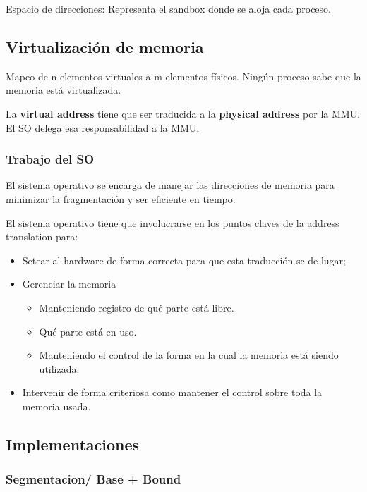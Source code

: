 \documentclass{article}
\begin{document}
Espacio de direcciones: Representa el sandbox donde se aloja cada
proceso.

\subsection{Virtualización de
memoria}\label{virtualizaciuxf3n-de-memoria}

Mapeo de n elementos virtuales a m elementos físicos. Ningún proceso
sabe que la memoria está virtualizada.

La \textbf{virtual address} tiene que ser traducida a la
\textbf{physical address} por la MMU. El SO delega esa responsabilidad a
la MMU.

\subsubsection{Trabajo del SO}\label{trabajo-del-so}

El sistema operativo se encarga de manejar las direcciones de memoria
para minimizar la fragmentación y ser eficiente en tiempo.

El sistema operativo tiene que involucrarse en los puntos claves de la
address translation para:

\begin{itemize}
\item
  Setear al hardware de forma correcta para que esta traducción se de
  lugar;
\item
  Gerenciar la memoria

  \begin{itemize}
  \item
    Manteniendo registro de qué parte está libre.
  \item
    Qué parte está en uso.
  \item
    Manteniendo el control de la forma en la cual la memoria está siendo
    utilizada.
  \end{itemize}
\item
  Intervenir de forma criteriosa como mantener el control sobre toda la
  memoria usada.
\end{itemize}

\subsection{Implementaciones}\label{implementaciones}

\subsubsection{Segmentacion/ Base +
Bound}\label{segmentacion-base-bound}
\end{document}
